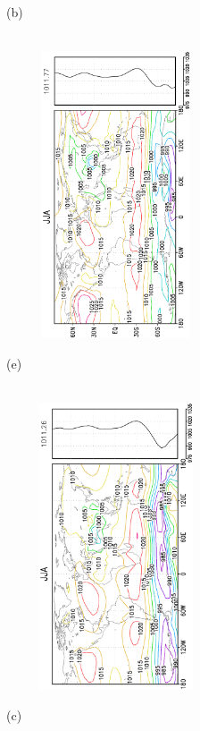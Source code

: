 \documentclass[12pt,a4paper,twoside,openright,headinclude,liststotoc,bibtotoc]{scrreprt}
\begin{document}
\begin{figure}[H]
{}
\parbox{8.5cm}{\hspace{0.50cm}\begin{scriptsize}(b)\end{scriptsize} \vspace{-0.7cm} \\
\includegraphics[height=8.5cm,width=6.5cm,angle=-90]
{eps/zonalfinalysmpres151JJA.eps}
}
\parbox{8.5cm}{\hspace{0.25cm}\begin{scriptsize}(e)\end{scriptsize} \vspace{-0.7cm} \\
\includegraphics[height=8.5cm,width=6.5cm,angle=-90]
{eps/zonalt21finalysmmslpJJA.eps}
}
\parbox{8.5cm}{\hspace{0.50cm}\begin{scriptsize}(c)\end{scriptsize} \vspace{-0.7cm} \\
}
\end{figure}
\end{document}
